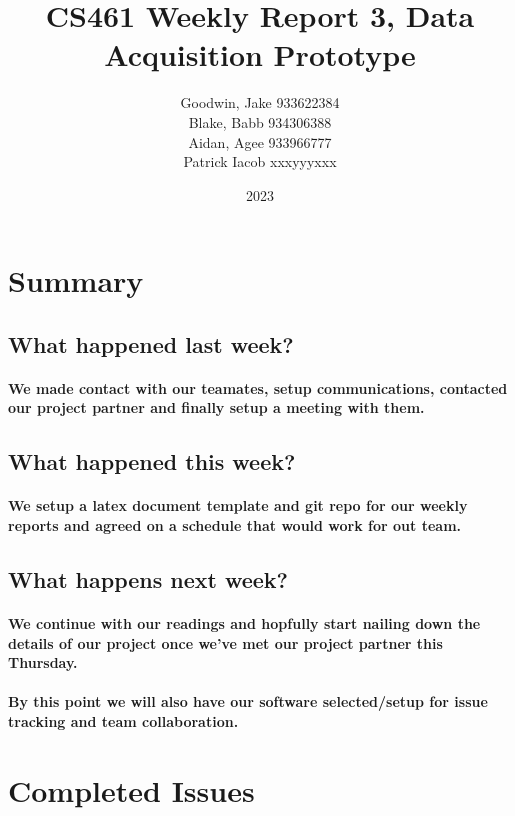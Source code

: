 \documentclass{article}
\title{CS461 Weekly Report 3, Data Acquisition Prototype}
\author{
    Goodwin, Jake
    933622384\\
    Blake, Babb
    934306388\\
    Aidan, Agee
    933966777\\
    Patrick Iacob
    xxxyyyxxx\\
}
\date{2023}
\begin{document}
\maketitle

\section{Summary}


\subsection{What happened last week?}
\paragraph{
We made contact with our teamates, setup communications, contacted our project
partner and finally setup a meeting with them.
}

\subsection{What happened this week?}
\paragraph{
We setup a latex document template and git repo for our weekly reports
and agreed on a schedule that would work for out team.
}


\subsection{What happens next week?}
\paragraph{
We continue with our readings and hopfully start nailing down the details
of our project once we've met our project partner this Thursday.
}

\paragraph{
    By this point we will also have our software selected/setup for issue tracking
    and team collaboration.
}

\section{Completed Issues}
\end{document}
